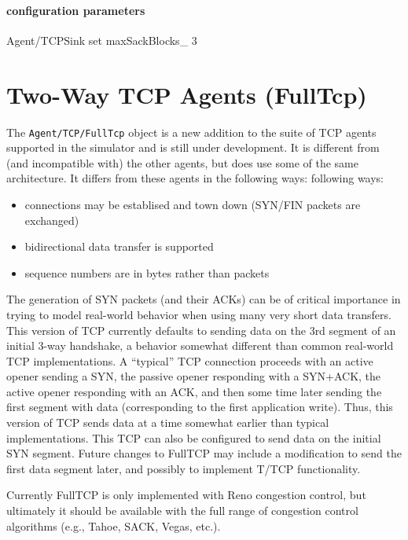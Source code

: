 \paragraph{configuration parameters}
\begin{program}
        Agent/TCPSink set maxSackBlocks_ 3
\end{program}

\section{Two-Way TCP Agents (FullTcp)}
\label{sec:fulltcp}

The {\tt Agent/TCP/FullTcp} object is a new addition to the suite of
TCP agents supported in the simulator and is still under development.
It is different from (and incompatible with) the other agents, but
does use some of the same architecture.
It differs from these agents in the following ways:
following ways:
\begin{itemize}\itemsep0pt
\item connections may be establised and town down
(SYN/FIN packets are exchanged)
\item bidirectional data transfer is supported
\item sequence numbers are in bytes rather than packets
\end{itemize}

The generation of SYN packets (and their ACKs) can be
of critical importance in trying to model real-world behavior
when using many very short data transfers.
This version of TCP currently defaults to sending
data on the 3rd segment of an initial 3-way handshake, a behavior
somewhat different than common real-world TCP implementations.
A ``typical'' TCP connection proceeds with an active opener
sending a SYN, the passive opener responding with a SYN+ACK,
the active opener responding with an ACK, and then some time later
sending the first segment with data (corresponding to the first
application write).
Thus, this version of TCP sends data at a time somewhat earlier
than typical implementations.
This TCP can also be configured to send data on the initial SYN
segment.
Future changes to FullTCP may include a modification to send the
first data segment later, and possibly to implement T/TCP functionality.

Currently FullTCP is only implemented with Reno congestion control,
but ultimately it should be available with the full range of
congestion control algorithms (e.g., Tahoe, SACK, Vegas, etc.).


